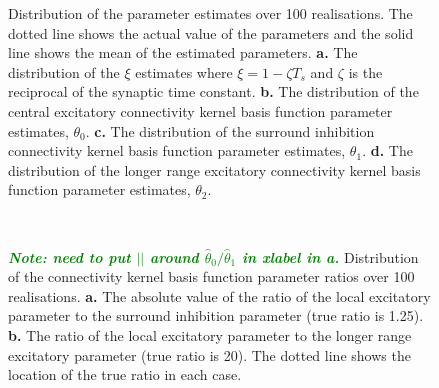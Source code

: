 \documentclass[10pt,a4paper]{article}
\newcommand{\dean}[1]{\textsf{\emph{\textbf{\textcolor{green}{#1}}}}}
\begin{document}
\begin{figure}
\caption{Distribution of the parameter estimates over 100
realisations. The dotted line shows the actual value of the parameters and the solid line shows the mean of the estimated parameters. \textbf{a.} The distribution of the $\xi$ estimates where $\xi=1-\zeta T_s $ and $\zeta$ is the reciprocal of the synaptic time constant. \textbf{b.} The distribution of the central excitatory connectivity kernel basis function parameter estimates, $\theta_0$. \textbf{c.} The distribution of the surround inhibition connectivity kernel basis function parameter estimates, $\theta_1$. \textbf{d.} The distribution of the longer range excitatory connectivity kernel basis function parameter estimates, $\theta_2$.}
\label{fig:Parameters}
\end{figure}
\begin{figure}
    \centering
{}
\\
\caption{\dean{Note: need to put $\left| \right|$ around $\hat\theta_0/\hat\theta_1$ in xlabel in \textbf{a.}} Distribution of the connectivity kernel basis function parameter ratios over 100 realisations. \textbf{a.} The absolute value of the ratio of the local excitatory parameter to the surround inhibition parameter (true ratio is 1.25). \textbf{b.} The ratio of the local excitatory parameter to the longer range excitatory parameter (true ratio is 20). The dotted line shows the location of the true ratio in each case.}
\label{fig:ParametersRatio}
\end{figure}
\end{document}

